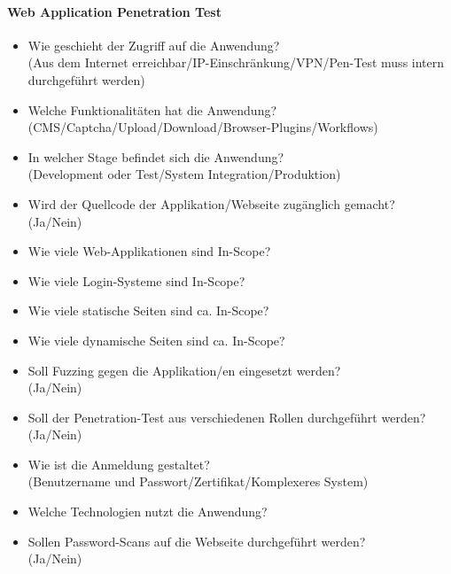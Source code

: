 \paragraph{Web Application Penetration Test}
\begin{itemize}
	\item Wie geschieht der Zugriff auf die Anwendung?\\
	(Aus dem Internet erreichbar/IP-Einschränkung/VPN/Pen-Test muss intern durchgeführt werden)
	\item Welche Funktionalitäten hat die Anwendung?\\
	(CMS/Captcha/Upload/Download/Browser-Plugins/Workflows)
	\item In welcher Stage befindet sich die Anwendung?\\
	(Development oder Test/System Integration/Produktion)
	\item Wird der Quellcode der Applikation/Webseite zugänglich gemacht?\\
	(Ja/Nein)
	\item Wie viele Web-Applikationen sind In-Scope?
	\item Wie viele Login-Systeme sind In-Scope?
	\item Wie viele statische Seiten sind ca. In-Scope?
	\item Wie viele dynamische Seiten sind ca. In-Scope?
	\item Soll Fuzzing gegen die Applikation/en eingesetzt werden?\\
	(Ja/Nein)
	\item Soll der Penetration-Test aus verschiedenen Rollen durchgeführt werden?\\
	(Ja/Nein)
	\item  Wie ist die Anmeldung gestaltet?\\
	(Benutzername und Passwort/Zertifikat/Komplexeres System)
	\item Welche Technologien nutzt die Anwendung?
	\item Sollen Password-Scans auf die Webseite durchgeführt werden?\\
	(Ja/Nein)
\end{itemize}

